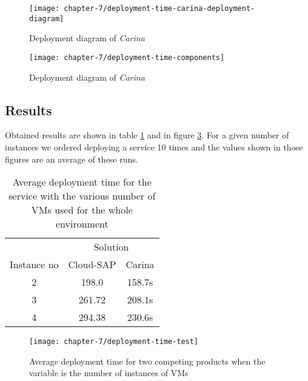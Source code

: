 \begin{figure}[!ht]
  \begin{center}
    \texttt{[image: chapter-7/deployment-time-carina-deployment-diagram]}
  \end{center}
  \caption{Deployment diagram of \emph{Carina}}
  \label{ch7:deployment-time-test-deployment-time-carina-deployment-diagram}
\end{figure}

\begin{figure}[!ht]
  \begin{center}
    \texttt{[image: chapter-7/deployment-time-components]}
  \end{center}
  \caption{Deployment diagram of \emph{Carina}}
  \label{ch7:deployment-time-test-deployment-time-components}
\end{figure}


\subsection*{Results}
Obtained results are shown in table \ref{tbl:test-service-deployment-time} and in figure \ref{ch7:deployment-time-test}. For a given number of instances we ordered deploying a service 10 times and the values shown in those figures are an average of these runs.

\begin{table}
  \centering
  \begin{tabular}{ c  c  c }
    \hline
    & \multicolumn{2}{c}{Solution} \\
    \cline{2-3}
    Instance no & Cloud-SAP & Carina \\
    \hline
    2 & 198.0 & 158.7s \\
    3 & 261.72 & 208.1s \\
    4 & 294.38 & 230.6s \\
    \hline
  \end{tabular}
  \caption{Average deployment time for the service with the various number of VMs used for the whole environment}
  \label{tbl:test-service-deployment-time}
\end{table}

\begin{figure}[!ht]
  \begin{center}
    \texttt{[image: chapter-7/deployment-time-test]}
  \end{center}
  \caption{Average deployment time for two competing products when the variable is the number of instances of VMs}
  \label{ch7:deployment-time-test}
\end{figure}

